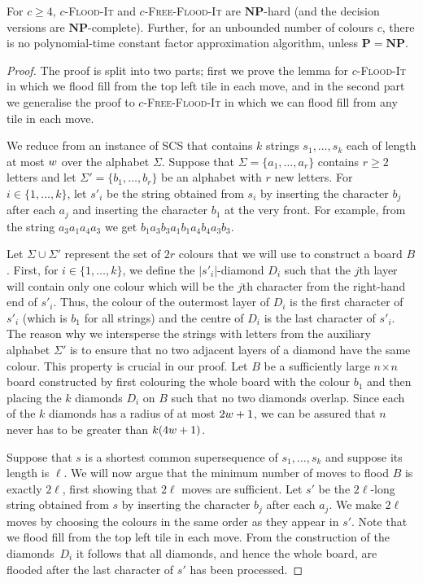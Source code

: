 \documentclass[a4paper,11pt]{llncs}
\newcounter{l}
\renewcommand{\geq}{\geqslant}
\newcommand{\Ptime}{\ensuremath{\mathbf{P}}}
\newcommand{\NPtime}{\ensuremath{\mathbf{NP}}}
\newcommand{\Coloroid}[1]{$#1$-\textsc{Flood-It}}
\newcommand{\ColoroidFree}[1]{$#1$-\textsc{Free-Flood-It}}
\newcommand{\SCS}{\textsc{SCS}}
\newcommand{\recdim}[2]{$#1$$\mspace{1mu}$$\times$$\mspace{1mu}$$#2$}
\begin{document}
\begin{lemma}
    \label{lem:NPC-four}
    For $c\geq 4$, \Coloroid{c} and \ColoroidFree{c} are \NPtime-hard (and the decision versions are \NPtime-complete). Further, for an unbounded number of colours $c$, there is no polynomial-time constant factor approximation algorithm, unless $\Ptime=\NPtime$.
\end{lemma}
\begin{proof}
    The proof is split into two parts; first we prove the lemma for \Coloroid{c} in which we flood fill from the top left tile in each move, and in the second part we generalise the proof to \ColoroidFree{c} in which we can flood fill from any tile in each move.

    We reduce from an instance of \SCS{} that contains $k$ strings $s_1,\dots,s_k$ each of length at most $w$ over the alphabet $\Sigma$. Suppose that $\Sigma=\{a_1,\dots,a_r\}$ contains $r\geq 2$ letters and let $\Sigma'=\{b_1,\dots,b_r\}$ be an alphabet with $r$ new letters. For $i\in \{1,\dots,k\}$, let $s'_i$ be the string obtained from $s_i$ by inserting the character $b_j$ after each $a_j$ and inserting the character $b_1$ at the very front. For example, from the string $a_3a_1a_4a_3$ we get $b_1a_3b_3a_1b_1a_4b_4a_3b_3$.

    Let $\Sigma\cup \Sigma'$ represent the set of $2r$ colours that we will use to construct a board $B$. First, for $i\in \{1,\dots,k\}$, we define the $|s'_i|$-diamond $D_i$ such that the $j$th layer will contain only one colour which will be the $j$th character from the right-hand end of $s'_i$. Thus, the colour of the outermost layer of $D_i$ is the first character of $s'_i$ (which is $b_1$ for all strings) and the centre of $D_i$ is the last character of $s'_i$. The reason why we intersperse the strings with letters from the auxiliary alphabet $\Sigma'$ is to ensure that no two adjacent layers of a diamond have the same colour. This property is crucial in our proof. Let $B$ be a sufficiently large \recdim{n}{n} board constructed by first colouring the whole board with the colour $b_1$ and then placing the $k$ diamonds $D_i$ on $B$ such that no two diamonds overlap. Since each of the $k$ diamonds has a radius of at most $2w+1$, we can be assured that $n$ never has to be greater than $k(4w+1)$.

    Suppose that $s$ is a shortest common supersequence of $s_1,\dots,s_k$ and suppose its length is $\ell$. We will now argue that the minimum number of moves to flood $B$ is exactly $2\ell$, first showing that $2\ell$ moves are sufficient. Let $s'$ be the $2\ell$-long string obtained from $s$ by inserting the character $b_j$ after each $a_j$. We make $2\ell$ moves by choosing the colours in the same order as they appear in $s'$. Note that we flood fill from the top left tile in each move. From the construction of the diamonds~$D_i$ it follows that all diamonds, and hence the whole board, are flooded after the last character of $s'$ has been processed.


\end{proof}
\end{document}

